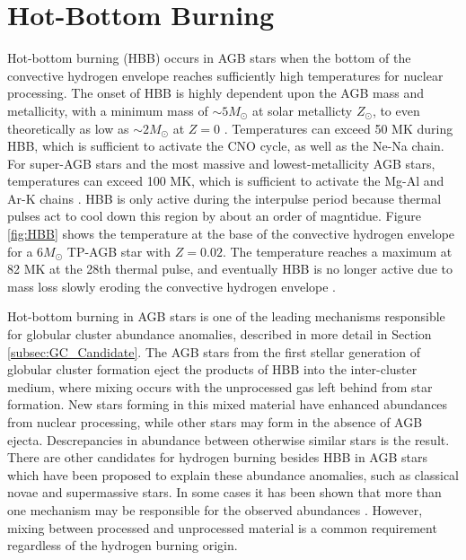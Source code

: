 \section{Hot-Bottom Burning} \label{sec:hot-bottom-burning}


Hot-bottom burning (HBB) occurs in AGB stars when the bottom of the convective hydrogen envelope reaches sufficiently high temperatures for nuclear processing. The onset of HBB is highly dependent upon the AGB mass and metallicity, with a minimum mass of $\sim 5 M_{\odot}$ at solar metallicty $Z_{\odot}$, to even theoretically as low as $\sim 2 M_{\odot}$ at $Z=0$ \cite{Habing2004}. Temperatures can exceed 50 MK during HBB, which is sufficient to activate the CNO cycle, as well as the Ne-Na chain. For super-AGB stars and the most massive and lowest-metallicity AGB stars, temperatures can exceed 100 MK, which is sufficient to activate the Mg-Al and Ar-K chains \cite{Karakas2014}. HBB is only active during the interpulse period because thermal pulses act to cool down this region by about an order of magntidue. Figure \ref{fig:HBB} shows the temperature at the base of the convective hydrogen envelope for a $6 M_{\odot}$ TP-AGB star with $Z = 0.02$. The temperature reaches a maximum at 82 MK at the 28th thermal pulse, and eventually HBB is no longer active due to mass loss slowly eroding the convective hydrogen envelope \cite{Karakas2014}.

Hot-bottom burning in AGB stars is one of the leading mechanisms responsible for globular cluster abundance anomalies, described in more detail in Section \ref{subsec:GC_Candidate}. The AGB stars from the first stellar generation of globular cluster formation eject the products of HBB into the inter-cluster medium, where mixing occurs with the unprocessed gas left behind from star formation. New stars forming in this mixed material have enhanced abundances from nuclear processing, while other stars may form in the absence of AGB ejecta. Descrepancies in abundance between otherwise similar stars is the result. There are other candidates for hydrogen burning besides HBB in AGB stars which have been proposed to explain these abundance anomalies, such as classical novae and supermassive stars. In some cases it has been shown that more than one mechanism may be responsible for the observed abundances \cite{Gratton2019}. However, mixing between processed and unprocessed material is a common requirement regardless of the hydrogen burning origin.

